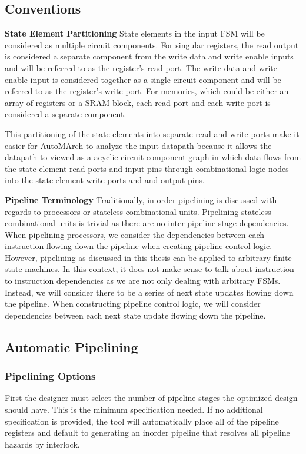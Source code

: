 \subsection{Conventions}
\label{section:conventions}
{\bf State Element Partitioning}
State elements in the input FSM will be considered as multiple circuit components. For singular registers, the read output is considered a separate component from the write data and write enable inputs and will be referred to as the register's read port. The write data and write enable input is considered together as a single circuit component and will be referred to as the register's write port. For memories, which could be either an array of registers or a SRAM block, each read port and each write port is considered a separate component. 

This partitioning of the state elements into separate read and write ports make it easier for AutoMArch to analyze the input datapath because it allows the datapath to viewed as a acyclic circuit component graph in which data flows from the state element read ports and input pins through combinational logic nodes into the state element write ports and and output pins.

{\bf Pipeline Terminology}
Traditionally, in order pipelining is discussed with regards to processors or stateless combinational units. Pipelining stateless combinational units is trivial as there are no inter-pipeline stage dependencies. When pipelining processors, we consider the dependencies between each instruction flowing down the pipeline when creating pipeline control logic. However, pipelining as discussed in this thesis can be applied to arbitrary finite state machines. In this context, it does not make sense to talk about instruction to instruction dependencies as we are not only dealing with arbitrary FSMs. Instead, we will consider there to be a series of next state updates flowing down the pipeline. When constructing pipeline control logic, we will consider dependencies between each next state update flowing down the pipeline.

\subsection{Automatic Pipelining}
\subsubsection{Pipelining Options}
\label{section:pipelineOptions}
First the designer must select the number of pipeline stages the optimized design should have. This is the minimum specification needed. If no additional specification is provided, the tool will automatically place all of the pipeline registers and default to generating an inorder pipeline that resolves all pipeline hazards by interlock.

